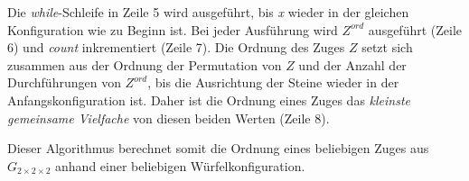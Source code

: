 \documentclass[12pt,a4paper, usenames, dvipsnames]{article}
\theoremstyle{mystyle}
\theoremstyle{definition}
\newcommand{\Gtwo}{\ensuremath{G_{2\times 2\times 2}}}
\begin{document}
Die \textit{while}-Schleife in Zeile 5 wird ausgeführt, bis \textit{x} wieder in der gleichen Konfiguration wie zu Beginn ist. Bei jeder Ausführung wird $Z^\textit{ord}$ ausgeführt (Zeile 6) und \textit{count} inkrementiert (Zeile 7).
Die Ordnung des Zuges $Z$ setzt sich zusammen aus der Ordnung der Permutation von $Z$ und der Anzahl der Durchführungen von $Z^\textit{ord}$, bis die Ausrichtung der Steine wieder in der Anfangskonfiguration ist. Daher ist die Ordnung eines Zuges das \textit{kleinste gemeinsame Vielfache} von diesen beiden Werten (Zeile 8).

Dieser Algorithmus berechnet somit die Ordnung eines beliebigen Zuges aus $\Gtwo$ anhand einer beliebigen Würfelkonfiguration.



%
%
%
%
%
%
%
%
%
%
%
%
%
%
%
%
%
%
%
%



%
%
%
%
%
%
%
%
%
%
%
%
%
%
%
%
%
%
%
%
\newpage
\end{document}
